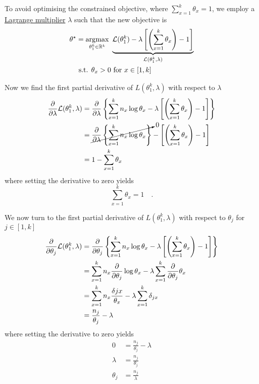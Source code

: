 To avoid optimising the constrained objective, where $\sum_{x=1}^k \theta_x = 1$, we employ a \href{https://en.wikipedia.org/wiki/Lagrange_multiplier}{Lagrange multiplier} $\lambda$ such that the new objective is
\begin{subequations}
\begin{align}
\theta^\star &= \operatorname*{\arg\!\max}_{\theta_1^k \in \mathbb R^k} ~ \underbrace{\mathcal L(\theta_1^k) - \lambda \left[ \left(\sum_{x=1}^k \theta_x\right) - 1\right]}_{\mathcal L(\theta_1^k, \lambda)} \\
 &~\text{s.t. } \theta_x > 0 \text{ for }x \in [1, k] \nonumber
\end{align}
\end{subequations}


Now we find the first partial derivative of  $L(\theta_1^k, \lambda)$ with respect to $\lambda$
\begin{subequations}
\begin{align}
	\pdv{\lambda}\mathcal L(\theta_1^k, \lambda) &= \pdv{\lambda} \left\{ \sum_{x=1}^k n_x \log \theta_x  - \lambda \left[ \left(\sum_{x=1}^k \theta_x\right) - 1 \right] \right\} \\
	&= \cancelto{0}{\pdv{\lambda} \left\{ \sum_{x=1}^k n_x \log \theta_x  \right\} } - \left[ \left(\sum_{x=1}^k \theta_x\right) - 1 \right] \\
	&= 1 - \sum_{x=1}^k \theta_x
\end{align}
\end{subequations}
where setting the derivative to zero yields
\begin{equation} \label{eq:cat-const}
	\sum_{x=1}^k \theta_x = 1 \quad . 
\end{equation}

We now turn to the first partial derivative of $L(\theta_1^k, \lambda)$ with respect to $\theta_j$ for $j \in [1, k]$
\begin{subequations}
\begin{align}
	\pdv{\theta_j}\mathcal L(\theta_1^k, \lambda) &= \pdv{\theta_j} \left\{ \sum_{x=1}^k n_x \log \theta_x  - \lambda \left[ \left(\sum_{x=1}^k \theta_x\right) - 1 \right] \right\} \\
	&= \sum_{x=1}^k n_x  \pdv{\theta_j} \log \theta_x - \lambda  \sum_{x=1}^k \pdv{\theta_j} \theta_x \\
	&= \sum_{x=1}^k n_x \frac{\delta{jx}}{\theta_x} - \lambda  \sum_{x=1}^k \delta_{jx} \\
	&= \frac{n_j}{\theta_j} - \lambda
\end{align}
\end{subequations}
where setting the derivative to zero yields
\begin{subequations}
\begin{align}
0 &= \frac{n_j}{\theta_j} -\lambda \\
\lambda &= \frac{n_j}{\theta_j} \label{eq:cat-not-zero} \\ 
\theta_j &= \frac{n_j}{\lambda} \label{eq:thetaj}
\end{align}
\end{subequations}


